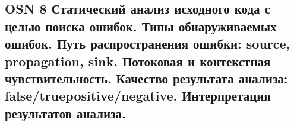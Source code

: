 \subsection{OSN 8 Статический анализ исходного кода с целью поиска ошибок. Типы обнаруживаемых ошибок. Путь распространения ошибки: source, propagation, sink. Потоковая и контекстная чувствительность. Качество результата анализа:
false/truepositive/negative. Интерпретация результатов анализа.}
